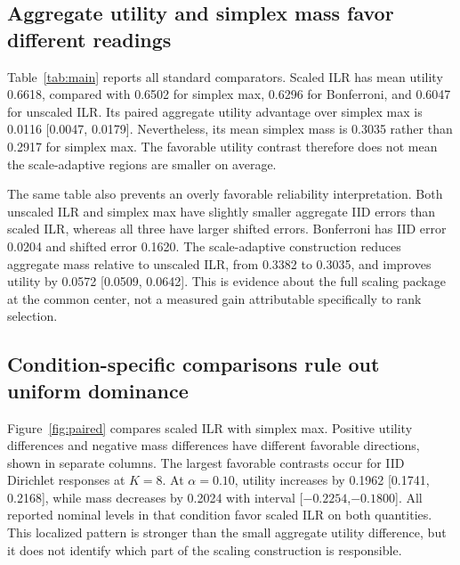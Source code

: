 \documentclass{article}
\begin{document}
\subsection{Aggregate utility and simplex mass favor different readings}
Table~\ref{tab:main} reports all standard comparators. Scaled ILR has mean utility 0.6618, compared with 0.6502 for simplex max, 0.6296 for Bonferroni, and 0.6047 for unscaled ILR. Its paired aggregate utility advantage over simplex max is 0.0116 [0.0047, 0.0179]. Nevertheless, its mean simplex mass is 0.3035 rather than 0.2917 for simplex max. The favorable utility contrast therefore does not mean the scale-adaptive regions are smaller on average. %

\begin{table}[t]
\centering\small
\caption{Held-out mean errors, normalized simplex mass, and utility. Errors are absolute deviations computed before averaging. Utility intervals are descriptive joint seed-block bootstrap intervals from our retained-data analysis. Smaller error and mass are favorable; larger utility is favorable.}
\label{tab:main}

\end{table}

The same table also prevents an overly favorable reliability interpretation. Both unscaled ILR and simplex max have slightly smaller aggregate IID errors than scaled ILR, whereas all three have larger shifted errors. Bonferroni has IID error 0.0204 and shifted error 0.1620. The scale-adaptive construction reduces aggregate mass relative to unscaled ILR, from 0.3382 to 0.3035, and improves utility by 0.0572 [0.0509, 0.0642]. This is evidence about the full scaling package at the common center, not a measured gain attributable specifically to rank selection. %

\subsection{Condition-specific comparisons rule out uniform dominance}
Figure~\ref{fig:paired} compares scaled ILR with simplex max. Positive utility differences and negative mass differences have different favorable directions, shown in separate columns. The largest favorable contrasts occur for IID Dirichlet responses at $K=8$. At $\alpha=0.10$, utility increases by 0.1962 [0.1741, 0.2168], while mass decreases by 0.2024 with interval [$-0.2254$,$-0.1800$]. All reported nominal levels in that condition favor scaled ILR on both quantities. This localized pattern is stronger than the small aggregate utility difference, but it does not identify which part of the scaling construction is responsible. %
\end{document}
